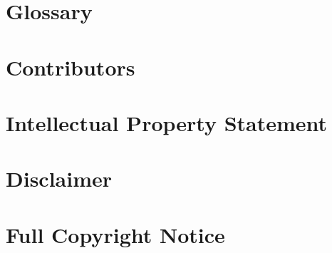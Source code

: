 \documentclass[10pt,a4paper]{article}
\begin{document}
\section{Glossary}
\label{sec:glossary}


\section{Contributors}


\section{Intellectual Property Statement}


\section{Disclaimer}


\section{Full Copyright Notice}




\end{document}
